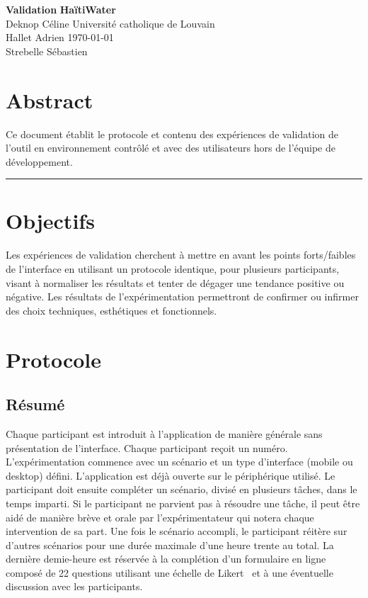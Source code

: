 \documentclass[a4paper, 11pt]{article}
\begin{document}
\noindent
\large\textbf{Validation} \hfill \textbf{HaïtiWater} \\
\normalsize Deknop Céline \hfill Université catholique de Louvain \\
Hallet Adrien \hfill \today \\
Strebelle Sébastien

\section*{Abstract}
    Ce document établit le protocole et contenu des expériences de validation de l'outil en environnement contrôlé et avec des utilisateurs hors de l'équipe de développement.
\hrule

\section{Objectifs}
    Les expériences de validation cherchent à mettre en avant les points forts/faibles de l'interface en utilisant un protocole identique, pour plusieurs participants, visant à normaliser les résultats et tenter de dégager une tendance positive ou négative. Les résultats de l'expérimentation permettront de confirmer ou infirmer des choix techniques, esthétiques et fonctionnels.

\section{Protocole}
    \subsection*{Résumé}
        Chaque participant est introduit à l'application de manière générale sans présentation de l'interface. Chaque participant reçoit un numéro. L'expérimentation commence avec un scénario et un type d'interface (mobile ou desktop) défini. L'application est déjà ouverte sur le périphérique utilisé. Le participant doit ensuite compléter un scénario, divisé en plusieurs tâches, dans le temps imparti. Si le participant ne parvient pas à résoudre une tâche, il peut être aidé de manière brève et orale par l'expérimentateur qui notera chaque intervention de sa part. Une fois le scénario accompli, le participant réitère sur d'autres scénarios pour une durée maximale d'une heure trente au total. La dernière demie-heure est réservée à la complétion d'un formulaire en ligne composé de 22 questions utilisant une échelle de Likert~\cite{wikipediaLikertScale} et à une éventuelle discussion avec les participants.
\end{document}
